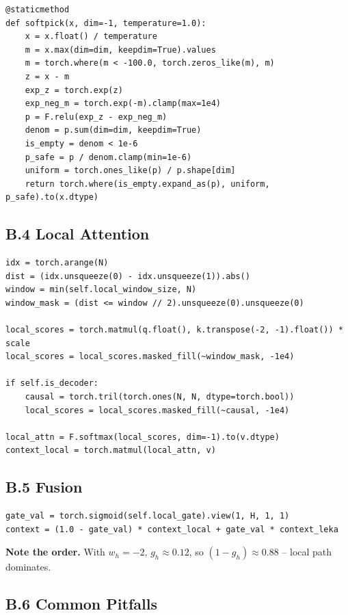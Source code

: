 \begin{lstlisting}
@staticmethod
def softpick(x, dim=-1, temperature=1.0):
    x = x.float() / temperature
    m = x.max(dim=dim, keepdim=True).values
    m = torch.where(m < -100.0, torch.zeros_like(m), m)
    z = x - m
    exp_z = torch.exp(z)
    exp_neg_m = torch.exp(-m).clamp(max=1e4)
    p = F.relu(exp_z - exp_neg_m)
    denom = p.sum(dim=dim, keepdim=True)
    is_empty = denom < 1e-6
    p_safe = p / denom.clamp(min=1e-6)
    uniform = torch.ones_like(p) / p.shape[dim]
    return torch.where(is_empty.expand_as(p), uniform, p_safe).to(x.dtype)
\end{lstlisting}

\subsection{B.4 Local Attention}

\begin{lstlisting}
idx = torch.arange(N)
dist = (idx.unsqueeze(0) - idx.unsqueeze(1)).abs()
window = min(self.local_window_size, N)
window_mask = (dist <= window // 2).unsqueeze(0).unsqueeze(0)

local_scores = torch.matmul(q.float(), k.transpose(-2, -1).float()) * scale
local_scores = local_scores.masked_fill(~window_mask, -1e4)

if self.is_decoder:
    causal = torch.tril(torch.ones(N, N, dtype=torch.bool))
    local_scores = local_scores.masked_fill(~causal, -1e4)

local_attn = F.softmax(local_scores, dim=-1).to(v.dtype)
context_local = torch.matmul(local_attn, v)
\end{lstlisting}

\subsection{B.5 Fusion}

\begin{lstlisting}
gate_val = torch.sigmoid(self.local_gate).view(1, H, 1, 1)
context = (1.0 - gate_val) * context_local + gate_val * context_leka
\end{lstlisting}

\textbf{Note the order.} With $w_h = -2$, $g_h \approx 0.12$, so $(1-g_h) \approx 0.88$ -- local path dominates.

\subsection{B.6 Common Pitfalls}

